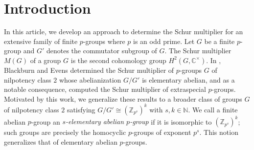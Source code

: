 \documentclass[preprint,sort&compress,12pt]{elsarticle}
\numberwithin{equation}{section}
\theoremstyle{definition}
\begin{document}
\section{Introduction}
In this article,  we develop an approach to determine the Schur multiplier for an extensive family of finite 
$p$-groups where $p$ is an odd prime. Let $G$ be a finite $p$-group and $G'$ denotes the commutator subgroup of $G$. The Schur multiplier $M(G)$ of a group $G$ is the second cohomology group $H^2(G,\mathbb{C}^\times)$. 
In \cite{BlaEve1979}, Blackburn and Evens determined the Schur multiplier of $p$-groups $G$ of nilpotency class $2$ whose abelianization $G/G'$ is
elementary abelian, and as a notable consequence, computed the Schur
multiplier of extraspecial $p$-groups. 
Motivated by this work, we generalize these results to a broader class of groups $G$ of
nilpotency class $2$ satisfying $G/G' \cong (\mathbb{Z}_{p^s})^{k}$ with $s,k \in \mathbb{N}$. We call a finite abelian \(p\)-group an \emph{\(s\)-elementary abelian \(p\)-group}
if it is isomorphic to \((\mathbb{Z}_{p^{s}})^{k}\); such groups are
precisely the homocyclic \(p\)-groups of exponent \(p^{s}\).
This notion generalizes that of elementary abelian \(p\)-groups.
\end{document}
